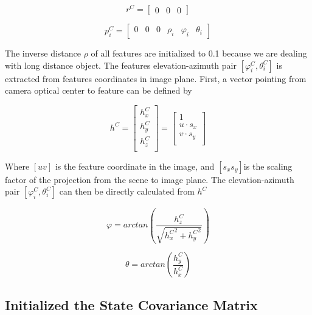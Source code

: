 \begin{equation}
r^{C}=\begin{bmatrix}0&0&0\end{bmatrix}
\end{equation}

\begin{equation}
p_{i}^{C}=\begin{bmatrix}0&0&0&\rho _{i}&\varphi_{i}&\theta_{i}\end{bmatrix}
\end{equation}

The inverse distance $\rho $ of all features are initialized to 0.1 
because we are dealing with long distance object. The features 
elevation-azimuth pair $[\varphi _{i}^{C}, \theta _{i}^{C}]$ is 
extracted from features coordinates in image plane. First, a vector 
pointing from camera optical center to feature can be defined by

\begin{equation}
h^{C}=\begin{bmatrix}
h_{x}^{C}\\
h_{y}^{C}\\
h_{z}^{C}\\
\end{bmatrix}
 = \begin{bmatrix}
1 \\
u\cdot s_{x} \\
v\cdot s_{y} \\
\end{bmatrix}
\end{equation}

Where $[u v]$ is the feature coordinate in the image, and $
[s_{x}s_{y}] $is the scaling factor of the projection from the scene to 
image plane. The elevation-azimuth pair $[\varphi _{i}^{C}, \theta 
_{i}^{C}]$ can then be directly calculated from $h^{C}$

\begin{equation}
\varphi 
=arctan\left(\frac{h_{z}^{C}}{\sqrt{{h_{x}^{C}}^{2}+{h_{y}^{C}}^{2}}}\right)
\end{equation}

\begin{equation}
\theta =arctan\left(\frac{h_{y}^{C}}{h_{x}^{C}}\right)
\end{equation}


\subsection{Initialized the State Covariance Matrix}

